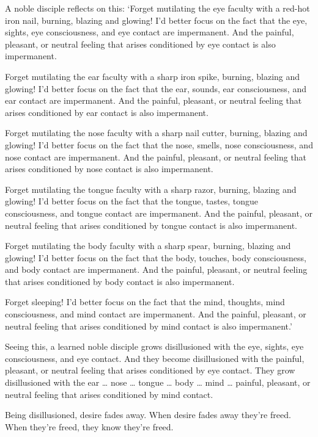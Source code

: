 \documentclass[12pt,openany]{book}%
\begin{document}
A noble disciple reflects on this: ‘Forget mutilating the eye faculty with a red-hot iron nail, burning, blazing and glowing! I’d better focus on the fact that the eye, sights, eye consciousness, and eye contact are impermanent. And the painful, pleasant, or neutral feeling that arises conditioned by eye contact is also impermanent. 

Forget mutilating the ear faculty with a sharp iron spike, burning, blazing and glowing! I’d better focus on the fact that the ear, sounds, ear consciousness, and ear contact are impermanent. And the painful, pleasant, or neutral feeling that arises conditioned by ear contact is also impermanent. 

Forget mutilating the nose faculty with a sharp nail cutter, burning, blazing and glowing! I’d better focus on the fact that the nose, smells, nose consciousness, and nose contact are impermanent. And the painful, pleasant, or neutral feeling that arises conditioned by nose contact is also impermanent. 

Forget mutilating the tongue faculty with a sharp razor, burning, blazing and glowing! I’d better focus on the fact that the tongue, tastes, tongue consciousness, and tongue contact are impermanent. And the painful, pleasant, or neutral feeling that arises conditioned by tongue contact is also impermanent. 

Forget mutilating the body faculty with a sharp spear, burning, blazing and glowing! I’d better focus on the fact that the body, touches, body consciousness, and body contact are impermanent. And the painful, pleasant, or neutral feeling that arises conditioned by body contact is also impermanent. 

Forget sleeping! I’d better focus on the fact that the mind, thoughts, mind consciousness, and mind contact are impermanent. And the painful, pleasant, or neutral feeling that arises conditioned by mind contact is also impermanent.’ 

Seeing this, a learned noble disciple grows disillusioned with the eye, sights, eye consciousness, and eye contact. And they become disillusioned with the painful, pleasant, or neutral feeling that arises conditioned by eye contact. They grow disillusioned with the ear … nose … tongue … body … mind … painful, pleasant, or neutral feeling that arises conditioned by mind contact. 

Being disillusioned, desire fades away. When desire fades away they’re freed. When they’re freed, they know they’re freed. 
\end{document}
